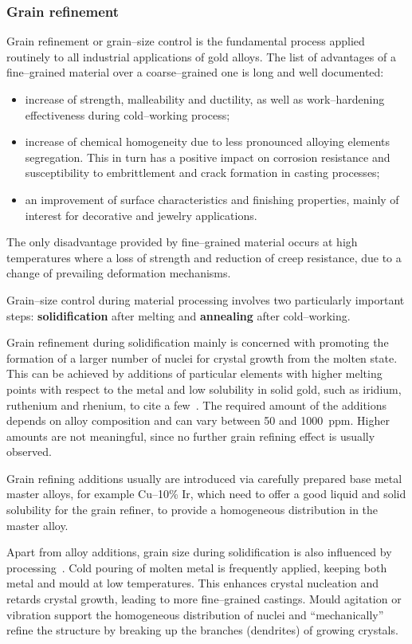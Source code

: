 \subsubsection{Grain refinement}
Grain refinement or grain--size control is the fundamental process applied routinely to all industrial applications of gold alloys. The list of advantages of a fine--grained material over a coarse--grained one is long and well documented:
\begin{itemize}
    \item increase of strength, malleability and ductility, as well as work--hardening effectiveness during cold--working process;
    \item increase of chemical homogeneity due to less pronounced alloying elements segregation. This in turn has a positive impact on corrosion resistance and susceptibility to embrittlement and crack formation in casting processes;
    \item an improvement of surface characteristics and finishing properties, mainly of interest for decorative and jewelry applications.
\end{itemize}

The only disadvantage provided by fine--grained material occurs at high temperatures where a loss of strength and reduction of creep resistance, due to a change of prevailing deformation mechanisms.

Grain--size control during material processing involves two particularly important steps: \textbf{solidification} after melting and \textbf{annealing} after cold--working.

Grain refinement during solidification mainly is concerned with promoting the formation of a larger number of nuclei for crystal growth from the molten state. This can be achieved by additions of particular elements with higher melting points with respect to the metal and low solubility in solid gold, such as iridium, ruthenium and rhenium, to cite a few~\cite{Nielsen1966}.
The required amount of the additions depends on alloy composition and can vary between \num{50} and \SI{1000}{ppm}. Higher amounts are not meaningful, since no further grain refining effect is usually observed.

Grain refining additions usually are introduced via carefully prepared base metal master alloys, for example Cu--10\% Ir, which need to offer a good liquid and solid solubility for the grain refiner, to provide a homogeneous distribution in the master alloy.

Apart from alloy additions, grain size during solidification is also influenced by processing~\cite{Ott1981}. Cold pouring of molten metal is frequently applied, keeping both metal and mould at low temperatures. This enhances crystal nucleation and retards crystal growth, leading to more fine--grained castings. Mould agitation or vibration support the homogeneous distribution of nuclei and ``mechanically'' refine the structure by breaking up the branches (dendrites) of growing crystals. 


